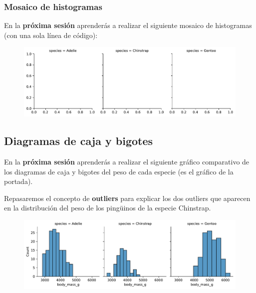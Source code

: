 \documentclass[
  a4paper,
  noprof,
  12pt,
  notoc,
  nosols,
  nobib]{mnye}
\theoremstyle{definition}
\theoremstyle{remark}
\begin{document}
\hypertarget{mosaico-de-histogramas}{%
\subsubsection{Mosaico de histogramas}\label{mosaico-de-histogramas}}

En la \textbf{próxima sesión} aprenderás a realizar el siguiente mosaico
de histogramas (con una sola línea de código):

\begin{figure}[tbph]

{\centering \includegraphics{chapters/numerical_by_categorical_files/figure-pdf/cell-6-output-1.pdf}

}

\end{figure}

\hypertarget{diagramas-de-caja-y-bigotes}{%
\subsection{Diagramas de caja y
bigotes}\label{diagramas-de-caja-y-bigotes}}

En la \textbf{próxima sesión} aprenderás a realizar el siguiente gráfico
comparativo de los diagramas de caja y bigotes del peso de cada especie
(es el gráfico de la portada).

Repasaremos el concepto de \textbf{outliers} para explicar los dos
outliers que aparecen en la distribución del peso de los pingüinos de la
especie Chinstrap.

\begin{figure}[tbph]

{\centering \includegraphics{chapters/numerical_by_categorical_files/figure-pdf/cell-7-output-1.pdf}

}

\end{figure}




\cleardoublepage
\printsols
\myprintbibliography[title=Bibliografía]
\end{document}

